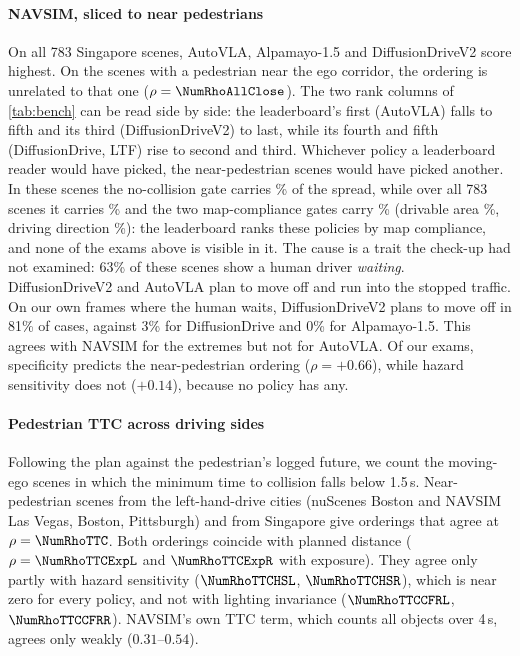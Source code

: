 \paragraph{NAVSIM, sliced to near pedestrians}
On all 783 Singapore scenes, AutoVLA, Alpamayo-1.5 and DiffusionDriveV2 score highest. On the
\NumNclose{} scenes with a pedestrian near the ego corridor, the ordering is unrelated to that one
($\rho=\NumRhoAllClose$). The two rank columns of \cref{tab:bench} can be read side by side: the
leaderboard's first (AutoVLA) falls to fifth and its third (DiffusionDriveV2) to last, while its
fourth and fifth (DiffusionDrive, LTF) rise to second and third. Whichever policy a leaderboard reader
would have picked, the near-pedestrian scenes would have picked another.
In these scenes the no-collision gate carries \NumNCshareClose\% of the spread, while over all 783
scenes it carries \NumNCshare\% and the two map-compliance gates carry \NumMapShare\% (drivable area
\NumDacShare\%, driving direction \NumDdcShare\%): the leaderboard ranks these policies by map
compliance, and none of the exams above is visible in it. The cause is a trait the check-up had not examined: 63\% of these
scenes show a human driver \emph{waiting}. DiffusionDriveV2 and AutoVLA plan to move off and run into
the stopped traffic. On our own frames where the human waits, DiffusionDriveV2 plans to move off in
81\% of cases, against 3\% for DiffusionDrive and 0\% for Alpamayo-1.5. This agrees with NAVSIM for the
extremes but not for AutoVLA. Of our exams, specificity predicts the near-pedestrian ordering
($\rho=+0.66$), while hazard sensitivity does not ($+0.14$), because no policy has any.

\paragraph{Pedestrian TTC across driving sides}
Following the plan against the pedestrian's logged future, we count the moving-ego scenes in which the
minimum time to collision falls below 1.5\,s. Near-pedestrian scenes from the left-hand-drive cities
(nuScenes Boston and NAVSIM Las Vegas, Boston, Pittsburgh) and from Singapore give orderings that agree
at $\rho=\NumRhoTTC$. Both orderings coincide with planned distance ($\rho=\NumRhoTTCExpL$ and $\NumRhoTTCExpR$ with exposure).
They agree only partly with hazard sensitivity ($\NumRhoTTCHSL$, $\NumRhoTTCHSR$), which is near zero for
every policy, and not with lighting invariance ($\NumRhoTTCCFRL$, $\NumRhoTTCCFRR$). NAVSIM's own TTC
term, which counts all objects over 4\,s, agrees only weakly ($0.31$--$0.54$).

